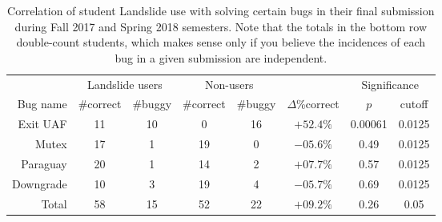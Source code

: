 \begin{table}[t]
	\begin{center}
		\small
	\begin{tabular}{r||cc|cc|c|cc}
		& \multicolumn{2}{c|}{Landslide users} & \multicolumn{2}{c|}{Non-users} & & \multicolumn{2}{c}{Significance} \\
		Bug name & \#correct & \#buggy & \#correct & \#buggy & $\Delta$\%correct & $p$ & cutoff \\
		\hline
		Exit UAF  & 11	& 10	& 0	& 16	& $+52.4\%$	& 0.00061	& 0.0125 \\
		Mutex     & 17	& 1	& 19	& 0	& $-05.6\%$	& 0.49 & 0.0125 \\
		Paraguay  & 20	& 1	& 14	& 2	& $+07.7\%$	& 0.57	& 0.0125 \\
		Downgrade & 10	& 3	& 19	& 4	& $-05.7\%$	& 0.69	& 0.0125 \\ %
		\hline
		Total     & 58	& 15	& 52	& 22	& $+09.2\%$	& 0.26 & 0.05 \\
	\end{tabular}
	\end{center}
	\caption{
		Correlation of student Landslide use with solving certain bugs in their final submission during Fall 2017 and Spring 2018 semesters.
		Note that the totals in the bottom row double-count students,
		which makes sense only if you believe the incidences of each bug in a given submission are independent.
		}
	\label{tab:eval-common-bugs}
\end{table}

